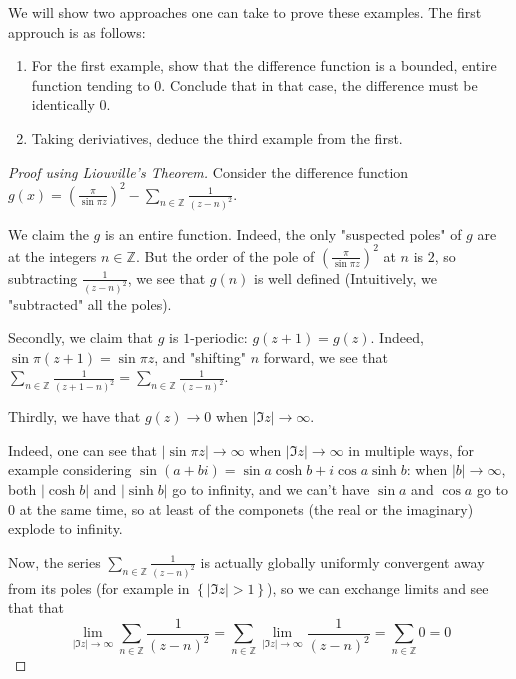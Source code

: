 \documentclass[11pt]{article} %
\theoremstyle{definition}
\theoremstyle{remark}
\newcommand{\abs}[1]{\left|#1\right|}
\begin{document}
We will show two approaches one can take to prove these examples. The first approuch is as follows:

\begin{enumerate}
\item For the first example, show that the difference function is a bounded, entire function tending to $0$. Conclude that in that case, the difference must be identically $0$.
\item Taking deriviatives, deduce the third example from the first.
\end{enumerate}

\begin{proof}[Proof using Liouville's Theorem]
Consider the difference function $g\left(x\right) = \left(\frac{\pi}{\sin\pi z}\right)^2 - \sum_{n\in\mathbb{Z}} \frac{1}{\left(z-n\right)^2}$.

We claim the $g$ is an entire function. Indeed, the only "suspected poles" of $g$ are at the integers $n \in \mathbb{Z}$. But the order of the pole of $\left(\frac{\pi}{\sin\pi z}\right)^2$ at $n$ is $2$, so subtracting $\frac{1}{\left(z-n\right)^2}$, we see that $g\left(n\right)$ is well defined (Intuitively, we "subtracted" all the poles).

Secondly, we claim that $g$ is $1$-periodic: $g\left(z+1\right) = g\left(z\right)$. Indeed, $\sin \pi \left(z + 1\right) = \sin \pi z$, and "shifting" $n$ forward, we see that $\sum_{n\in\mathbb{Z}} \frac{1}{\left(z+1-n\right)^2} = \sum_{n\in\mathbb{Z}}\frac{1}{\left(z-n\right)^2}$.

Thirdly, we have that $g\left(z\right) \to 0$ when $\abs{\Im z} \to \infty$.

Indeed, one can see that $\abs{\sin \pi z} \to \infty$ when $\abs{\Im z} \to \infty$ in multiple ways, for example considering $\sin\left(a + bi\right) = \sin a \cosh b + i \cos a \sinh b$: when $\abs{b} \to \infty$, both $\abs{\cosh b}$ and $\abs{\sinh b}$ go to infinity, and we can't have $\sin a$ and $\cos a$ go to $0$ at the same time, so at least of the componets (the real or the imaginary) explode to infinity.

Now, the series $\sum _{n\in\mathbb{Z}}\frac{1}{\left(z-n\right)^2}$ is actually globally uniformly convergent away from its poles (for example in $\left\{\abs{\Im z} > 1\right\}$), so we can exchange limits and see that that
\[ \lim _{\abs{\Im z} \to \infty}\sum _{n\in \mathbb{Z}} \frac{1}{\left(z-n\right)^2} = \sum_{n\in \mathbb{Z}} \lim_{\abs{\Im z} \to \infty} \frac{1}{\left(z-n\right)^2} = \sum_{n\in\mathbb{Z}} 0 = 0\]


\end{proof}
\end{document}

